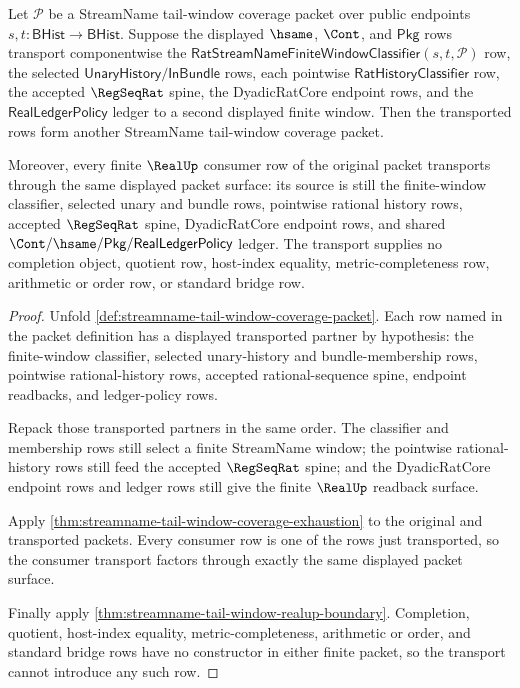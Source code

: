 \begin{theorem}
\label{thm:streamname-tail-window-hsame-transport-stability}
Let $\mathcal P$ be a StreamName tail-window coverage packet over public
endpoints $s,t:\mathsf{BHist}\to\mathsf{BHist}$. Suppose the displayed
$\hsame$, $\Cont$, and $\mathsf{Pkg}$ rows transport componentwise the
$\mathsf{RatStreamNameFiniteWindowClassifier}(s,t,\mathcal P)$ row, the
selected $\mathsf{UnaryHistory}/\mathsf{InBundle}$ rows, each pointwise
$\mathsf{RatHistoryClassifier}$ row, the accepted $\RegSeqRat$ spine, the
DyadicRatCore endpoint rows, and the $\mathsf{RealLedgerPolicy}$ ledger to a
second displayed finite window. Then the transported rows form another
StreamName tail-window coverage packet.

Moreover, every finite $\RealUp$ consumer row of the original packet
transports through the same displayed packet surface: its source is still the
finite-window classifier, selected unary and bundle rows, pointwise rational
history rows, accepted $\RegSeqRat$ spine, DyadicRatCore endpoint rows, and
shared $\Cont/\hsame/\mathsf{Pkg}/\mathsf{RealLedgerPolicy}$ ledger. The
transport supplies no completion object, quotient row, host-index equality,
metric-completeness row, arithmetic or order row, or standard bridge row.
\end{theorem}
\begin{proof}
Unfold \autoref{def:streamname-tail-window-coverage-packet}. Each row named in
the packet definition has a displayed transported partner by hypothesis: the
finite-window classifier, selected unary-history and bundle-membership rows,
pointwise rational-history rows, accepted rational-sequence spine, endpoint
readbacks, and ledger-policy rows.

Repack those transported partners in the same order. The classifier and
membership rows still select a finite StreamName window; the pointwise
rational-history rows still feed the accepted $\RegSeqRat$ spine; and the
DyadicRatCore endpoint rows and ledger rows still give the finite $\RealUp$
readback surface.

Apply \autoref{thm:streamname-tail-window-coverage-exhaustion} to the original
and transported packets. Every consumer row is one of the rows just transported,
so the consumer transport factors through exactly the same displayed packet
surface.

Finally apply \autoref{thm:streamname-tail-window-realup-boundary}. Completion,
quotient, host-index equality, metric-completeness, arithmetic or order, and
standard bridge rows have no constructor in either finite packet, so the
transport cannot introduce any such row.
\end{proof}

